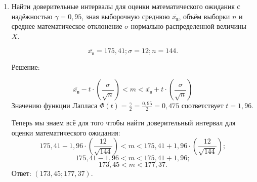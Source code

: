 \documentclass{article}
\begin{document}
\begin{enumerate}
\item %
Найти доверительные интервалы для оценки математического ожидания с надёжностью $\gamma=0,95$, зная выборочную среднюю $\overline{x_\textit{в}}$, объём выборки $n$ и среднее математическое отклонение $\sigma$ нормально распределенной величины $X$.

$$\overline{x_\textit{в}}=175,41; \sigma=12; n=144.$$
\begin{center}Решение:\end{center}
$$\overline{x_\textit{в}}-t\cdot\left(\frac{\sigma}{\sqrt{n}}\right)<m<\overline{x_\textit{в}}+t\cdot\left(\frac{\sigma}{\sqrt{n}}\right)$$
Значению функции Лапласа $\Phi(t)=\frac{\gamma}{2}=\frac{0,95}{2}=0,475$ соответствует $t=1,96$.

Теперь мы знаем всё для того чтобы найти доверительный интервал для оценки математического ожидания:
$$175,41-1,96\cdot\left(\frac{12}{\sqrt{144}}\right)<m<175,41+1,96\cdot\left(\frac{12}{\sqrt{144}}\right);$$
$$175,41-1,96<m<175,41+1,96;$$
$$173,45<m<177,37.$$
Ответ: $(173,45;177,37)$.

\end{enumerate}
\end{document}
